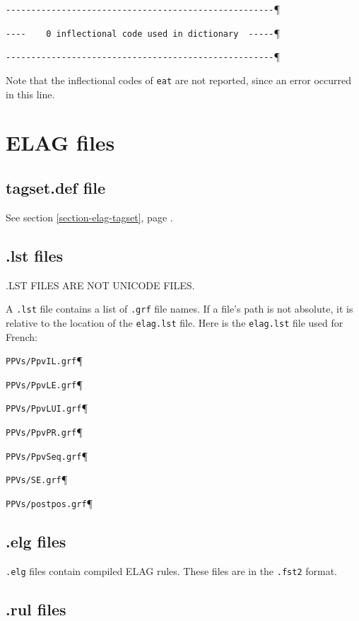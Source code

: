 \verb$-----------------------------------------------------$\P

\verb$----    0 inflectional code used in dictionary  -----$\P

\verb$-----------------------------------------------------$\P

\bigskip
\noindent Note that the inflectional codes of \verb+eat+ are not reported, since
an error occurred in this line.


\section{ELAG files}
\subsection{tagset.def file}
See section \ref{section-elag-tagset}, page \pageref{section-elag-tagset}.

\subsection{.lst files}

.LST FILES ARE NOT UNICODE FILES.

\bigskip
\noindent A \verb$.lst$ file contains a list of \verb$.grf$ file names. If
a file's path is not absolute, it is relative to the location
of the \verb$elag.lst$ file. Here is the \verb$elag.lst$ file used for French:


\bigskip
\verb$PPVs/PpvIL.grf$\P

\verb$PPVs/PpvLE.grf$\P

\verb$PPVs/PpvLUI.grf$\P

\verb$PPVs/PpvPR.grf$\P

\verb$PPVs/PpvSeq.grf$\P

\verb$PPVs/SE.grf$\P

\verb$PPVs/postpos.grf$\P

\subsection{.elg files}

\verb$.elg$ files contain compiled ELAG rules. These files are in the
\verb$.fst2$ format.


\subsection{.rul files}

